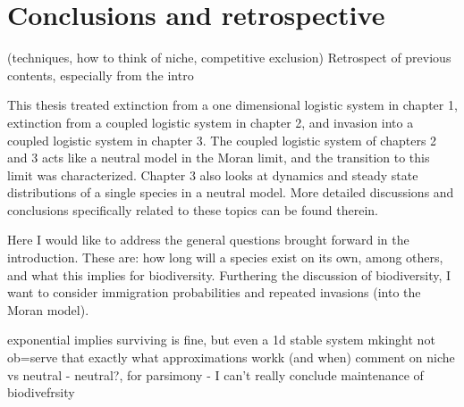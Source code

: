\section{Conclusions and retrospective}
 (techniques, how to think of niche, competitive exclusion)
Retrospect of previous contents, especially from the intro

This thesis treated extinction from a one dimensional logistic system in chapter 1, extinction from a coupled logistic system in chapter 2, and invasion into a coupled logistic system in chapter 3. The coupled logistic system of chapters 2 and 3 acts like a neutral model in the Moran limit, and the transition to this limit was characterized. Chapter 3 also looks at dynamics and steady state distributions of a single species in a neutral model. %
More detailed discussions and conclusions specifically related to these topics can be found therein. 

Here I would like to address the general questions brought forward in the introduction. 
These are: how long will a species exist on its own, among others, and what this implies for biodiversity. 
Furthering the discussion of biodiversity, I want to consider immigration probabilities and repeated invasions (into the Moran model). 

exponential implies surviving is fine, but even a 1d stable system mkinght not ob=serve that exactly
what approximations workk (and when)
comment on niche vs neutral - neutral?, for parsimony - I can't really conclude
maintenance of biodivefrsity

